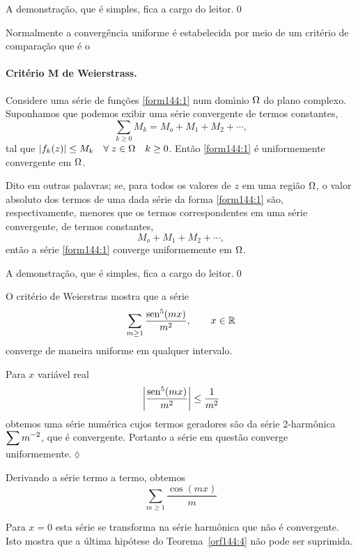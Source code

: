 \prova A demonstra\c{c}\~{a}o, que \'{e} simples, fica a cargo do leitor.\qed

Normalmente a converg\^{e}ncia uniforme \'{e} estabelecida por meio de um
crit\'{e}rio de compara\c{c}\~{a}o que \'{e} o

\paragraph{Crit\'{e}rio M de Weierstrass.} Considere uma s\'{e}rie de fun\c{c}\~{o}es
\eqref{form144:1} num dom\'{\i}nio $\Omega$ do plano complexo. Suponhamos
que podemos exibir uma s\'{e}rie convergente de termos constantes,
\begin{equation}\label{form144:5}
\sum_{k\ge 0}M_k= M_o+M_1+M_2+\cdots,
\end{equation}
tal que $|f_k(z)|\le M_k\quad \forall\;z\in \Omega\quad k\ge 0$.
Ent\~{a}o \eqref{form144:1} \'{e} uniformemente convergente em $\Omega$.

Dito em outras palavras; se, para todos os valores de $z$ em uma
regi\~{a}o $\Omega$, o valor absoluto dos termos de uma dada s\'{e}rie da
forma \eqref{form144:1} s\~{a}o, respectivamente, menores que os
termos correspondentes em uma s\'{e}rie convergente, de termos
constantes,
\begin{equation*}
M_o+M_1+M_2+\cdots,
\end{equation*}
ent\~{a}o a s\'{e}rie \eqref{form144:1} converge uniformemente em $\Omega$.

\prova A demonstra\c{c}\~{a}o, que \'{e} simples, fica a cargo do leitor.\qed

\begin{exer}\label{exe144:7}
O crit\'{e}rio de Weierstras mostra que a s\'{e}rie
\begin{equation*}
\sum_{m\ge 1}\frac{\operatorname{sen}^{5}(mx)}{m^2},\qquad   x \in \mathbb{R}
\end{equation*}
converge de maneira uniforme em qualquer intervalo.
\end{exer}

\solo Para $x$ vari\'{a}vel real
\begin{equation*}
\left|\frac{\operatorname{sen}^{5}(mx)}{m^2} \right|\le \frac{1}{m^{2}}
\end{equation*}
obtemos uma s\'{e}rie num\'{e}rica cujos termos geradores s\~{a}o da s\'{e}rie
2-harm\^{o}nica $\displaystyle{\sum m^{-2}}$, que \'{e} convergente. Portanto a
s\'{e}rie em quest\~{a}o converge uniformemente.\hfill \(\lozenge\)

\begin{obs}
Derivando a s\'{e}rie termo a termo, obtemos
\begin{equation*}
\sum_{m\geq 1}\frac{\cos(mx)}{m}
\end{equation*}

Para $x = 0$ esta s\'{e}rie se transforma na s\'{e}rie harm\^{o}nica que n\~{a}o \'{e}
convergente. Isto mostra que a \'{u}ltima hip\'{o}tese do
Teorema~\ref{orf144:4} n\~{a}o pode ser suprimida.
\end{obs}

